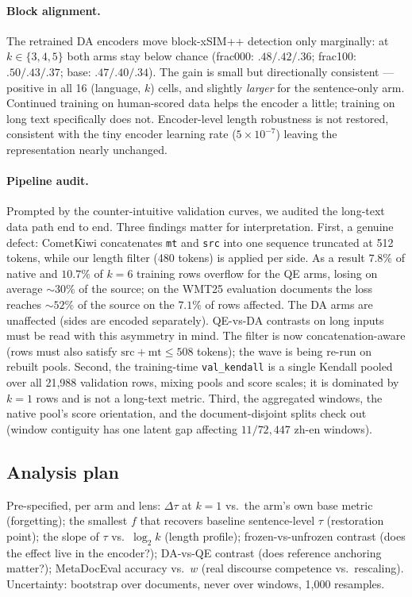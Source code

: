 \documentclass[11pt]{article}
\begin{document}
\paragraph{Block alignment.}
The retrained DA encoders move block-xSIM++ detection only marginally: at $k \in \{3,4,5\}$ both arms stay below chance (frac000: $.48/.42/.36$; frac100: $.50/.43/.37$; base: $.47/.40/.34$).
The gain is small but directionally consistent --- positive in all 16 (language, $k$) cells, and slightly \emph{larger} for the sentence-only arm.
Continued training on human-scored data helps the encoder a little; training on long text specifically does not.
Encoder-level length robustness is not restored, consistent with the tiny encoder learning rate ($5 \times 10^{-7}$) leaving the representation nearly unchanged.

\paragraph{Pipeline audit.}
Prompted by the counter-intuitive validation curves, we audited the long-text data path end to end.
Three findings matter for interpretation.
First, a genuine defect: CometKiwi concatenates \texttt{mt} and \texttt{src} into one sequence truncated at 512 tokens, while our length filter (480 tokens) is applied per side.
As a result $7.8\%$ of native and $10.7\%$ of $k{=}6$ training rows overflow for the QE arms, losing on average ${\sim}30\%$ of the source; on the WMT25 evaluation documents the loss reaches ${\sim}52\%$ of the source on the $7.1\%$ of rows affected.
The DA arms are unaffected (sides are encoded separately).
QE-vs-DA contrasts on long inputs must be read with this asymmetry in mind.
The filter is now concatenation-aware (rows must also satisfy $\text{src}+\text{mt} \le 508$ tokens); the wave is being re-run on rebuilt pools.
Second, the training-time \texttt{val\_kendall} is a single Kendall pooled over all 21{,}988 validation rows, mixing pools and score scales; it is dominated by $k{=}1$ rows and is not a long-text metric.
Third, the aggregated windows, the native pool's score orientation, and the document-disjoint splits check out (window contiguity has one latent gap affecting $11/72{,}447$ zh-en windows).

\subsection{Analysis plan}

Pre-specified, per arm and lens:
$\Delta\tau$ at $k{=}1$ vs.\ the arm's own base metric (forgetting);
the smallest $f$ that recovers baseline sentence-level $\tau$ (restoration point);
the slope of $\tau$ vs.\ $\log_2 k$ (length profile);
frozen-vs-unfrozen contrast (does the effect live in the encoder?);
DA-vs-QE contrast (does reference anchoring matter?);
MetaDocEval accuracy vs.\ $w$ (real discourse competence vs.\ rescaling).
Uncertainty: bootstrap over documents, never over windows, 1{,}000 resamples.
\end{document}
